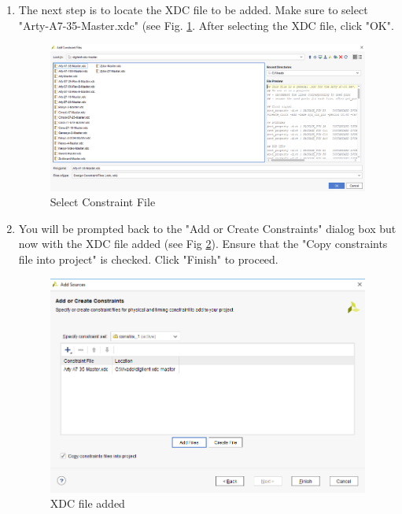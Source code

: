 \documentclass{article}
\begin{document}
\begin{enumerate}
    \item The next step is to locate the XDC file to be added. Make sure to select "Arty-A7-35-Master.xdc" (see Fig. \ref{fig:9-locate_artyA7xdc}. 
    After selecting the XDC file, click "OK".
      \begin{figure}[h!]
        \centering
        \includegraphics[width=\linewidth]{img/program/9-locate_artyA7xdc.png}
        \caption{Select Constraint File}
        \label{fig:9-locate_artyA7xdc}
      \end{figure}

    \item You will be prompted back to the "Add or Create Constraints" dialog box but now with the XDC file added (see Fig \ref{fig:10-add_constraint_done}). 
    Ensure that the "Copy constraints file into project" is checked. Click "Finish" to proceed.
      \begin{figure}[h!]
        \centering
        \includegraphics[width=0.5\linewidth]{img/program/10-add_constraint_done.png}
        \caption{XDC file added}
        \label{fig:10-add_constraint_done}
      \end{figure}


\end{enumerate}
\end{document}
